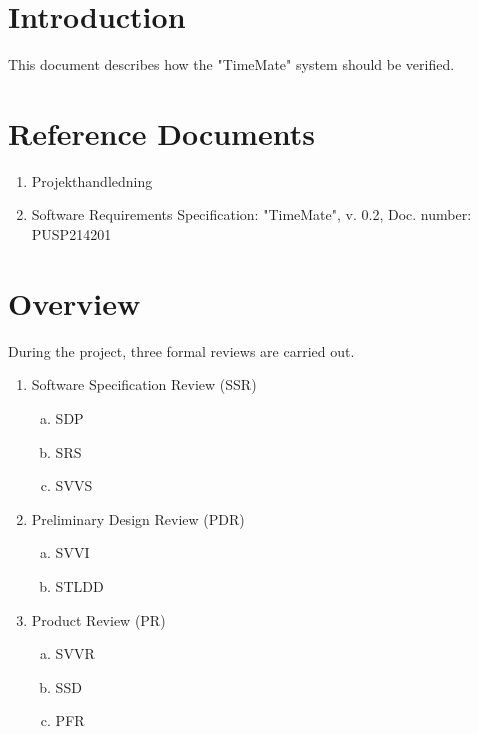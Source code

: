 \documentclass{article}
\date {#1}
\title {
    \documentNumber {02}    
    
    \documentVersion {0.1}
    
    \documentTitle {Software Verification and Validation Specification}
    \documentGroup {2}
    
    \documentResponsible {Test Group}
    \documentAuthors {Test Group}
    
    \documentDate {2021-02-02}
}
\begin{document}
\maketitle
\thispagestyle{empty}

\newpage

\tableofcontents

\newpage


\section{Introduction}

	This document describes how the "TimeMate" system should be verified. 

\section{Reference Documents}

\begin{enumerate}
  \item Projekthandledning 
  \item Software Requirements Specification: "TimeMate", v. 0.2, Doc. number: PUSP214201
\end{enumerate}

\section{Overview}
During the project, three formal reviews are carried out.


\begin{enumerate}
	\item Software Specification Review (SSR)
		\begin{enumerate}[a.] 
			\item SDP
			\item SRS 
			\item SVVS 
		\end{enumerate}
	\item Preliminary Design Review (PDR) 
		\begin{enumerate}[a.]
			\item SVVI
			\item STLDD
		\end{enumerate}
	\item Product Review (PR) 
		\begin{enumerate}[a.]
			\item SVVR 
			\item SSD 
			\item PFR 
		\end{enumerate}
\end{enumerate}
\end{document}
